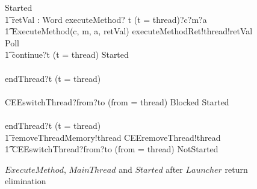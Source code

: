 \begin{figure}[tp!]
  \begin{circusaction}
    Started \circdef \\
    \t1 \circblockbegin
    \circvar retVal : Word \circspot executeMethod? t \prefixcolon (t = thread)?c?m?a \then {} \\
    \t1 ExecuteMethod(c, m, a, retVal) \circseq executeMethodRet!thread!retVal \then Poll \circseq \\
    \t1 \circblockbegin
    continue?t \prefixcolon (t = thread) \then Started \\
    {} \extchoice {} \\
    endThread?t \prefixcolon (t = thread) \then \Skip
    \circblockend \\
    {} \extchoice {} \\
    CEEswitchThread?from?to \prefixcolon (from = thread) \then Blocked \circseq Started \\
    {} \extchoice {} \\
    endThread?t \prefixcolon (t = thread) \then \Skip
    \circblockend \circseq \\
    \t1 removeThreadMemory!thread \then CEEremoveThread!thread \\
    \t1 {} \then CEEswitchThread?from?to \prefixcolon (from = thread) \then NotStarted
  \end{circusaction}
  \caption{$ExecuteMethod$, $MainThread$ and $Started$ after
    $Launcher$ return elimination}
  \label{efs-eliminate-returns-example-figure1}
\end{figure}

